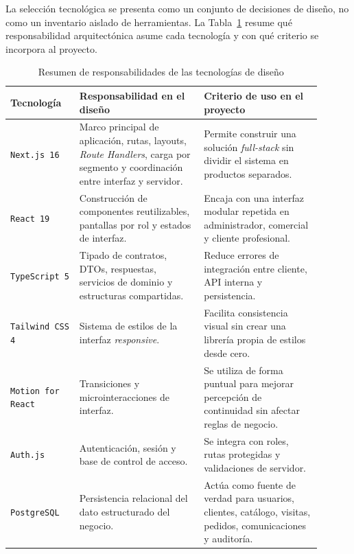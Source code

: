 La selección tecnológica se presenta como un conjunto de decisiones de diseño, no como un inventario aislado de herramientas. La Tabla~\ref{tab:design-technologies-summary} resume qué responsabilidad arquitectónica asume cada tecnología y con qué criterio se incorpora al proyecto.

\begin{table}[H]
\caption{Resumen de responsabilidades de las tecnologías de diseño}
\label{tab:design-technologies-summary}
\centering
{\scriptsize
\setlength{\tabcolsep}{3pt}
\renewcommand{\arraystretch}{1.10}
\begin{tabular}{|>{\raggedright\arraybackslash}p{0.20\linewidth}|>{\raggedright\arraybackslash}p{0.36\linewidth}|>{\raggedright\arraybackslash}p{0.34\linewidth}|}
\hline
\rowcolor{black!8}
\textbf{Tecnología} & \textbf{Responsabilidad en el diseño} & \textbf{Criterio de uso en el proyecto} \\
\hline
\texttt{Next.js 16} \citep{nextjsdocs2026,nextjsroutehandlers2026,nextjsloading2026} & Marco principal de aplicación, rutas, layouts, \textit{Route Handlers}, carga por segmento y coordinación entre interfaz y servidor. & Permite construir una solución \textit{full-stack} sin dividir el sistema en productos separados. \\
\hline
\texttt{React 19} \citep{reactdocs2026} & Construcción de componentes reutilizables, pantallas por rol y estados de interfaz. & Encaja con una interfaz modular repetida en administrador, comercial y cliente profesional. \\
\hline
\texttt{TypeScript 5} \citep{typescriptdocs2026} & Tipado de contratos, DTOs, respuestas, servicios de dominio y estructuras compartidas. & Reduce errores de integración entre cliente, API interna y persistencia. \\
\hline
\texttt{Tailwind CSS 4} \citep{tailwinddocs2026} & Sistema de estilos de la interfaz \textit{responsive}. & Facilita consistencia visual sin crear una librería propia de estilos desde cero. \\
\hline
\texttt{Motion for React} \citep{motionreactdocs2026} & Transiciones y microinteracciones de interfaz. & Se utiliza de forma puntual para mejorar percepción de continuidad sin afectar reglas de negocio. \\
\hline
\texttt{Auth.js} \citep{authjsdocs2026} & Autenticación, sesión y base de control de acceso. & Se integra con roles, rutas protegidas y validaciones de servidor. \\
\hline
\texttt{PostgreSQL} \citep{postgresdocs2026} & Persistencia relacional del dato estructurado del negocio. & Actúa como fuente de verdad para usuarios, clientes, catálogo, visitas, pedidos, comunicaciones y auditoría. \\

\end{tabular}}
\end{table}
